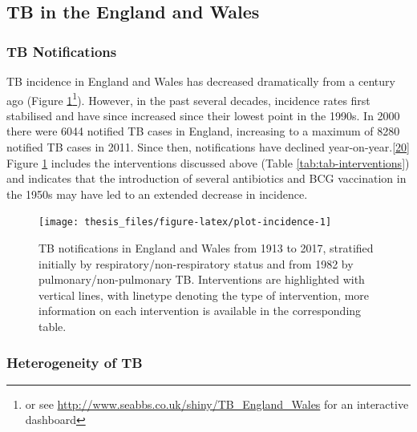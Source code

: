 \documentclass[11pt,twoside]{bristolthesis}
\begin{document}
  \hypertarget{tb-in-the-england-and-wales}{%
  \subsection{TB in the England and Wales}\label{tb-in-the-england-and-wales}}
  
  \hypertarget{tb-notifications}{%
  \subsubsection{TB Notifications}\label{tb-notifications}}
  
  TB incidence in England and Wales has decreased dramatically from a century ago (Figure \ref{fig:plot-incidence}\footnote{or see \url{http://www.seabbs.co.uk/shiny/TB_England_Wales} for an interactive dashboard}). However, in the past several decades, incidence rates first stabilised and have since increased since their lowest point in the 1990s. In 2000 there were 6044 notified TB cases in England, increasing to a maximum of 8280 notified TB cases in 2011. Since then, notifications have declined year-on-year.{[}\protect\hyperlink{ref-PHE2016a}{20}{]} Figure \ref{fig:plot-incidence} includes the interventions discussed above (Table \ref{tab:tab-interventions}) and indicates that the introduction of several antibiotics and BCG vaccination in the 1950s may have led to an extended decrease in incidence.
  \begin{figure}
  
  {\centering \texttt{[image: thesis\_files/figure-latex/plot-incidence-1]} 
  
  }
  
  \caption[TB notifications in England and Wales from 1913 to 2017, stratified initially by respiratory/non-respiratory status and from 1982 by pulmonary/non-pulmonary TB.]{TB notifications in England and Wales from 1913 to 2017, stratified initially by respiratory/non-respiratory status and from 1982 by pulmonary/non-pulmonary TB. Interventions are highlighted with vertical lines, with linetype denoting the type of intervention, more information on each intervention is available in the corresponding table.}\label{fig:plot-incidence}
  \end{figure}
  \hypertarget{heterogeneity-of-tb}{%
  \subsubsection{Heterogeneity of TB}\label{heterogeneity-of-tb}}
  
\end{document}
